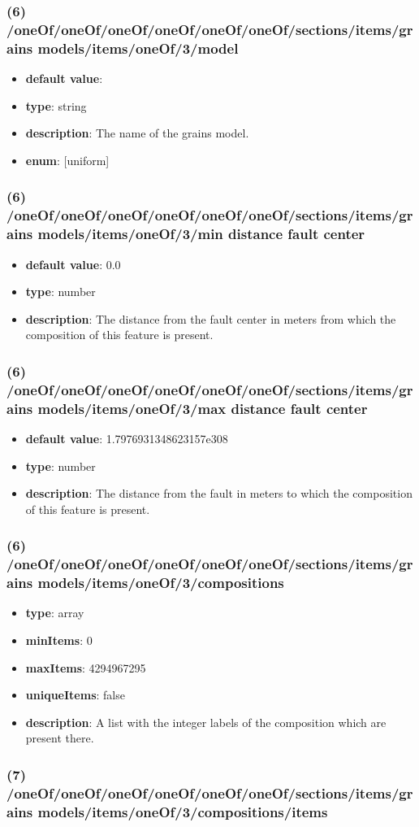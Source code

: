 \subsubsection{(6) /oneOf/oneOf/oneOf/oneOf/oneOf/oneOf/sections/items/grains models/items/oneOf/3/model}
\begin{itemize}[leftmargin=6em]\item {\bf default value}: 
\item {\bf type}: string
\item {\bf description}: The name of the grains model.
\item {\bf enum}: [uniform]\end{itemize}\subsubsection{(6) /oneOf/oneOf/oneOf/oneOf/oneOf/oneOf/sections/items/grains models/items/oneOf/3/min distance fault center}
\begin{itemize}[leftmargin=6em]\item {\bf default value}: 0.0
\item {\bf type}: number
\item {\bf description}: The distance from the fault center in meters from which the composition of this feature is present.
\end{itemize}\subsubsection{(6) /oneOf/oneOf/oneOf/oneOf/oneOf/oneOf/sections/items/grains models/items/oneOf/3/max distance fault center}
\begin{itemize}[leftmargin=6em]\item {\bf default value}: 1.7976931348623157e308
\item {\bf type}: number
\item {\bf description}: The distance from the fault in meters to which the composition of this feature is present.
\end{itemize}\subsubsection{(6) /oneOf/oneOf/oneOf/oneOf/oneOf/oneOf/sections/items/grains models/items/oneOf/3/compositions}
\begin{itemize}[leftmargin=6em]\item {\bf type}: array
\item {\bf minItems}: 0
\item {\bf maxItems}: 4294967295
\item {\bf uniqueItems}: false
\item {\bf description}: A list with the integer labels of the composition which are present there.
\end{itemize}\subsubsection{(7) /oneOf/oneOf/oneOf/oneOf/oneOf/oneOf/sections/items/grains models/items/oneOf/3/compositions/items}
